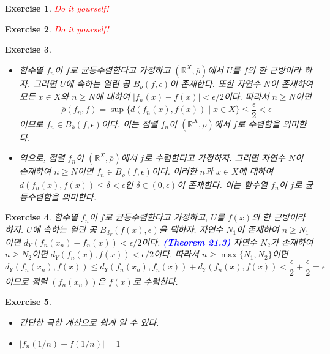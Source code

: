 \documentclass{article}
\newtheorem{exercise}{Exercise}[section]
\newcommand{\R}{\mathbb{R}}
\begin{document}
\begin{exercise}
    \textcolor{red}{Do it yourself!}
\end{exercise}

\begin{exercise}
    \textcolor{red}{Do it yourself!}
\end{exercise}

\begin{exercise}
    \phantom{}
    \begin{itemize}
        \item[($\Longrightarrow$)] 함수열 $f_n$이 $f$로 균등수렴한다고 가정하고 $(\R^X,\overline{\rho})$에서 $U$를 $f$의 한 근방이라 하자. 그러면 $U$에 속하는 열린 공 $B_{\overline{\rho}}(f,\epsilon)$이 존재한다. 또한 자연수 $N$이 존재하여 모든 $x\in X$와 $n\geq N$에 대하여 $\vert f_n(x)-f(x)\vert<\epsilon/2$이다. 따라서 $n\geq N$이면
            \[
                \overline{\rho}(f_n,f)=\sup\{\overline{d}(f_n(x),f(x))\mid x\in X\}\leq\frac{\epsilon}{2}<\epsilon
            \]
            이므로 $f_n\in B_{\overline{\rho}}(f,\epsilon)$이다. 이는 점렬 $f_n$이 $(\R^X,\overline{\rho})$에서 $f$로 수렴함을 의미한다.
        \item[($\Longleftarrow$)] 역으로, 점렬 $f_n$이 $(\R^X,\overline{\rho})$에서 $f$로 수렴한다고 가정하자. 그러면 자연수 $N$이 존재하여 $n\geq N$이면 $f_n\in B_{\overline{\rho}}(f,\epsilon)$이다. 이러한 $n$과 $x\in X$에 대하여 $d(f_n(x),f(x))\leq\delta<\epsilon$인 $\delta\in(0,\epsilon)$이 존재한다. 이는 함수열 $f_n$이 $f$로 균등수렴함을 의미한다. 
    \end{itemize}
\end{exercise}

\begin{exercise}
    함수열 $f_n$이 $f$로 균등수렴한다고 가정하고, $U$를 $f(x)$의 한 근방이라 하자. $U$에 속하는 열린 공 $B_{d_Y}(f(x),\epsilon)$을 택하자. 자연수 $N_1$이 존재하여 $n\geq N_1$이면 $d_Y(f_n(x_n)-f_n(x))<\epsilon/2$이다. \textcolor{blue}{\textbf{(Theorem 21.3)}} 자연수 $N_2$가 존재하여 $n\geq N_2$이면 $d_Y(f_n(x),f(x))<\epsilon/2$이다. 따라서 $n\geq\max\{N_1,N_2\}$이면
    \[
        d_Y(f_n(x_n),f(x))\leq d_Y(f_n(x_n),f_n(x))+d_Y(f_n(x),f(x))<\frac{\epsilon}{2}+\frac{\epsilon}{2}=\epsilon
    \]
    이므로 점렬 $(f_n(x_n))$은 $f(x)$로 수렴한다.
\end{exercise}

\begin{exercise}
	\label{exc:21.9}
    \phantom{}
    \begin{itemize}
        \item[(a)] 간단한 극한 계산으로 쉽게 알 수 있다.
        \item[(b)] $\vert f_n(1/n)-f(1/n)\vert=1$
    \end{itemize}
\end{exercise}
\end{document}
